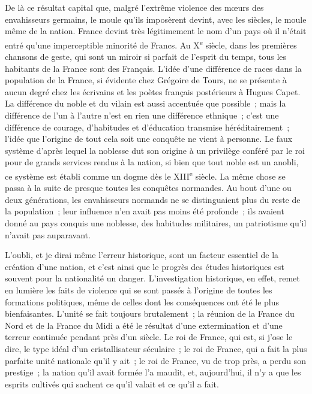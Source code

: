 \documentclass[twoside]{book} %
\newcommand\orgName[1]{#1}
\newcommand\persName[1]{#1}
\newcommand\placeName[1]{#1}
\begin{document}
De là ce résultat capital que, malgré l’extrême violence des mœurs des envahisseurs germains, le moule qu’ils imposèrent devint, avec les siècles, le moule même de la nation. {\placeName France} devint très légitimement le nom d’un pays où il n’était entré qu’une imperceptible minorité de {\orgName Francs}. Au X\textsuperscript{e} siècle, dans les premières chansons de geste, qui sont un miroir si parfait de l’esprit du temps, tous les habitants de la {\placeName France} sont des Français. L’idée d’une différence de races dans la population de la {\placeName France}, si évidente chez {\persName Grégoire de Tours}, ne se présente à aucun degré chez les écrivains et les poètes français postérieurs à {\persName Hugues Capet}. La différence du noble et du vilain est aussi accentuée que possible ; mais la différence de l’un à l’autre n’est en rien une différence ethnique ; c’est une différence de courage, d’habitudes et d’éducation transmise héréditairement ; l’idée que l’origine de tout cela soit une conquête ne vient à personne. Le faux système d’après lequel la noblesse dut son origine à un privilège conféré par le roi pour de grands services rendus à la nation, si bien que tout noble est un anobli, ce système est établi comme un dogme dès le XIII\textsuperscript{e} siècle. La même chose se passa à la suite de presque toutes les conquêtes normandes. Au bout d’une ou deux générations, les envahisseurs normands ne se distinguaient plus du reste de la population ; leur influence n’en avait pas moins été profonde ; ils avaient donné au pays conquis une noblesse, des habitudes militaires, un patriotisme qu’il n’avait pas auparavant.\par
L’oubli, et je dirai même l’erreur historique, sont un facteur essentiel de la création d’une nation, et c’est ainsi que le progrès des études historiques est souvent pour la nationalité un danger. L’investigation historique, en effet, remet en lumière les faits de violence qui se sont passés à l’origine de toutes les formations politiques, même de celles dont les conséquences ont été le plus bienfaisantes. L’unité se fait toujours brutalement ; la réunion de la {\placeName France du Nord} et de la {\placeName France du Midi} a été le résultat d’une extermination et d’une terreur continuée pendant près d’un siècle. Le {\persName roi de France}, qui est, si j’ose le dire, le type idéal d’un cristallisateur séculaire ; le {\persName roi de France}, qui a fait la plus parfaite unité nationale qu’il y ait ; le {\persName roi de France}, vu de trop près, a perdu son prestige ; la nation qu’il avait formée l’a maudit, et, aujourd’hui, il n’y a que les esprits cultivés qui sachent ce qu’il valait et ce qu’il a fait.\par
\end{document}
